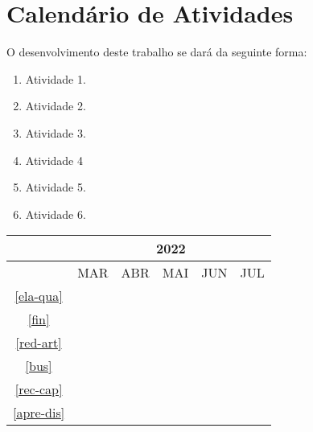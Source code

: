 \chapter{Calendário de Atividades}
\label{ch:calendario-de-atividades}

O desenvolvimento deste trabalho se dará da seguinte forma:

\begin{enumerate}
	\item \label{ela-qua} Atividade 1.
	\item \label{fin} Atividade 2.
	\item \label{red-art} Atividade 3.
	\item \label{bus} Atividade 4 
	\item \label{rec-cap} Atividade 5.
	\item \label{apre-dis} Atividade 6.
\end{enumerate}

\begin{table}[htbp]
	\centering
		\begin{tabular}{|c|c|c|c|c|c|}
		\hline
		&\multicolumn{5}{c|}{2022}\\
		\hline
		&MAR&ABR&MAI&JUN&JUL\\
		\hline
		\ref{ela-qua}&\cellcolor{midgray}&&&&\\
		\hline
		\ref{fin}&&\cellcolor{midgray}&\cellcolor{midgray}&&\\
		\hline	
		\ref{red-art}&&&\cellcolor{midgray}&&\\
		\hline			
		\ref{bus}&&&&\cellcolor{midgray}&\\
		\hline
		\ref{rec-cap}&&&&\cellcolor{midgray}&\cellcolor{midgray}\\
		\hline	
		\ref{apre-dis}&&&&&\cellcolor{midgray}\\
		\hline	
		\end{tabular}
\end{table}

